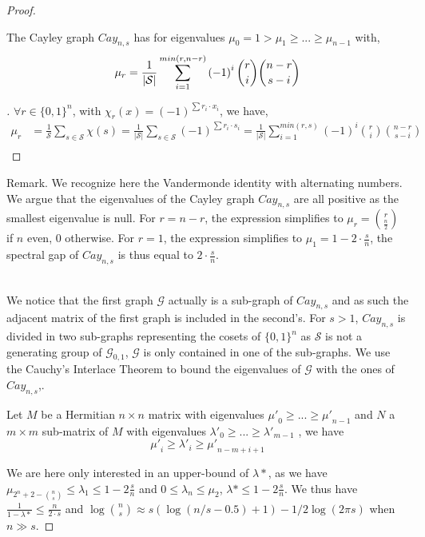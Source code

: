 \documentclass{llncs}
\newenvironment{subproof}[1][\proofname]{%
  \renewcommand{\qedsymbol}{$\blacksquare$}%
  \begin{proof}[#1]%
}{%
  \end{proof}%
}
\begin{document}
\begin{proof}
\begin{theorem}
The Cayley graph $Cay_{n,s}$ has for eigenvalues $\mu_0 = 1 > \mu_1 \geq ... \geq \mu_{n-1}$ with, 
$$\mu_r = \frac{1}{\left | \mathcal{S} \right |} \sum_{i=1}^{min(r, n-r)} \left ( -1 \right )^i {r \choose i}{n-r \choose s-i}\\$$
\end{theorem}

\begin{subproof}
$\forall r \in \{0,1\}^n$, with $\chi_r(x)=\left ( -1 \right )^{\sum r_i \cdot x_i}$, we have,
\begin{align*}
\mu_r &= \frac{1}{\mathcal{S}} \sum_{s\in \mathcal{S}} \chi\left(s\right) = \frac{1}{\left | \mathcal{S} \right |} \sum_{s\in \mathcal{S}} \left ( -1 \right )^{\sum r_i \cdot s_i} = \frac{1}{\left | \mathcal{S} \right |} \sum_{i=1}^{min(r, s)} \left ( -1 \right )^i {r \choose i}{n-r \choose s-i} \\
\end{align*}
\end{subproof}

Remark. We recognize here the Vandermonde identity with alternating numbers. We argue that the eigenvalues of the Cayley graph $Cay_{n,s}$ are all positive as the smallest eigenvalue is null.
For $r=n-r$, the expression simplifies to $\mu_r = {r \choose \frac{n}{2}}$ if $n$ even, 0 otherwise.
For $r=1$, the expression simplifies to $\mu_1 = 1 - 2\cdot \frac{s}{n}$, the spectral gap of $Cay_{n,s}$ is thus equal to $2\cdot \frac{s}{n}$.\\\

We notice that the first graph $\mathcal{G}$ actually is a sub-graph of $Cay_{n,s}$ and as such the adjacent matrix of the first graph is included in the second's.
For $s>1$, $Cay_{n,s}$ is divided in two sub-graphs representing the cosets of $\{0,1\}^n$ as $\mathcal{S}$ is not a generating group of $\mathcal{G}_{0,1}$, $\mathcal{G}$ is only contained in one of the sub-graphs.
We use the Cauchy's Interlace Theorem to bound the eigenvalues of $\mathcal{G}$ with the ones of $Cay_{n,s}$,.

\begin{theorem}
Let $M$ be a Hermitian $n \times n$ matrix with eigenvalues ${\mu'}_0\geq ... \geq {\mu'}_{n-1}$ and $N$ a $m \times m$ sub-matrix of $M$ with eigenvalues ${\lambda'}_0\geq ... \geq {\lambda'}_{m-1}$ , we have
$$ {\mu'}_i \geq {\lambda'}_i \geq {\mu'}_{n-m+i+1} $$
\end{theorem}

We are here only interested in an upper-bound of $\lambda*$, as we have $\mu_{2^n+2-{n \choose s}}\leq \lambda_1\leq 1-2\frac{s}{n}$ and $0 \leq \lambda_n \leq \mu_2$, $\lambda* \leq 1-2\frac{s}{n}$. We thus have $\frac{1}{1-\lambda*}\leq\frac{n}{2\cdot s}$ and $\log {n \choose s} \approx s(\log(n/s-0.5)+1) -1/2\log(2\pi s)$ when $n \gg s$.
\end{proof}
\end{document}
